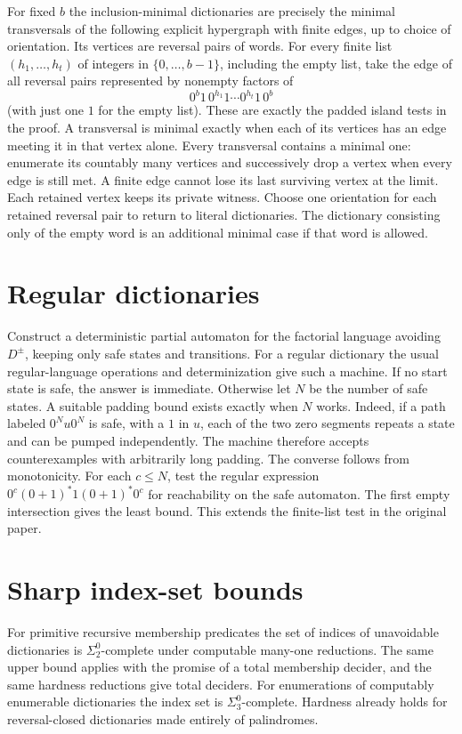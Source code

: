 \documentclass[10pt]{article}
\begin{document}
For fixed $b$ the inclusion-minimal dictionaries are precisely the minimal transversals of the following explicit hypergraph with finite edges, up to choice of orientation. Its vertices are reversal pairs of words. For every finite list $(h_1,\ldots,h_t)$ of integers in $\{0,\ldots,b-1\}$, including the empty list, take the edge of all reversal pairs represented by nonempty factors of
\[
         0^b 1\,0^{h_1}1\cdots 0^{h_t}1\,0^b
\]
(with just one $1$ for the empty list). These are exactly the padded island tests in the proof. A transversal is minimal exactly when each of its vertices has an edge meeting it in that vertex alone. Every transversal contains a minimal one: enumerate its countably many vertices and successively drop a vertex when every edge is still met. A finite edge cannot lose its last surviving vertex at the limit. Each retained vertex keeps its private witness. Choose one orientation for each retained reversal pair to return to literal dictionaries. The dictionary consisting only of the empty word is an additional minimal case if that word is allowed.

\section{Regular dictionaries}
Construct a deterministic partial automaton for the factorial language avoiding $D^\pm$, keeping only safe states and transitions. For a regular dictionary the usual regular-language operations and determinization give such a machine. If no start state is safe, the answer is immediate. Otherwise let $N$ be the number of safe states. A suitable padding bound exists exactly when $N$ works. Indeed, if a path labeled $0^N u0^N$ is safe, with a $1$ in $u$, each of the two zero segments repeats a state and can be pumped independently. The machine therefore accepts counterexamples with arbitrarily long padding. The converse follows from monotonicity. For each $c\le N$, test the regular expression $0^c(0+1)^*1(0+1)^*0^c$ for reachability on the safe automaton. The first empty intersection gives the least bound. This extends the finite-list test in the original paper.

\section{Sharp index-set bounds}
For primitive recursive membership predicates the set of indices of unavoidable dictionaries is $\Sigma^0_2$-complete under computable many-one reductions. The same upper bound applies with the promise of a total membership decider, and the same hardness reductions give total deciders. For enumerations of computably enumerable dictionaries the index set is $\Sigma^0_3$-complete. Hardness already holds for reversal-closed dictionaries made entirely of palindromes.
\end{document}
